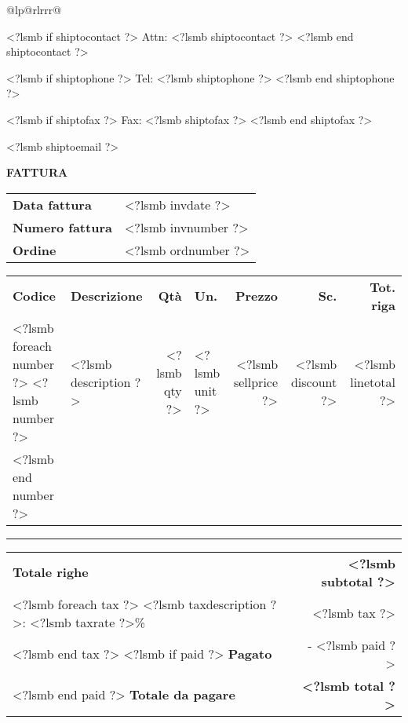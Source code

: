\documentclass[twoside]{scrartcl}
\begin{document}
\begin{tabular*}{\textwidth}{@{}lp{\descrwidth}@{\extracolsep\fill}rlrrr@{}}
{<?lsmb if shiptocontact ?>
Attn: <?lsmb shiptocontact ?>
\vspace{0.3cm}
<?lsmb end shiptocontact ?>

<?lsmb if shiptophone ?>
Tel: <?lsmb shiptophone ?>
<?lsmb end shiptophone ?>

<?lsmb if shiptofax ?>
Fax: <?lsmb shiptofax ?>
<?lsmb end shiptofax ?>

<?lsmb shiptoemail ?>
}
\hfill

\vspace{1cm}

\textbf{FATTURA}
\hfill

\vspace{1cm}

\begin{tabular}[t]{l@{\hspace{0.3cm}}l}
  \textbf{Data fattura} & <?lsmb invdate ?> \\
  \textbf{Numero fattura} & <?lsmb invnumber ?> \\
  \textbf{Ordine} & <?lsmb ordnumber ?>
\end{tabular}

\vspace{1cm}

\begin{tabular*}{\textwidth}{@{}lp{\descrwidth}@{\extracolsep\fill}rlrrr@{}}
  \textbf{Codice} & \textbf{Descrizione} & \textbf{Qt\`a} &
    \textbf{Un.} & \textbf{Prezzo} & \textbf{Sc.} & \textbf{Tot. riga} \\
<?lsmb foreach number ?>
  <?lsmb number ?> & <?lsmb description ?> & <?lsmb qty ?> &
    <?lsmb unit ?> & <?lsmb sellprice ?> & <?lsmb discount ?> & <?lsmb linetotal ?> \\
<?lsmb end number ?>
\end{tabular*}


\parbox{\textwidth}{
\rule{\textwidth}{2pt}

\vspace{0.2cm}

\hfill
\begin{tabularx}{7cm}{Xr@{}}
  \textbf{Totale righe} & \textbf{<?lsmb subtotal ?>} \\
<?lsmb foreach tax ?>
  <?lsmb taxdescription ?>: <?lsmb taxrate ?>\% & <?lsmb tax ?>\\
<?lsmb end tax ?>
<?lsmb if paid ?>
  \textbf{Pagato} & - <?lsmb paid ?> \\
<?lsmb end paid ?>
  \hline
  \textbf{Totale da pagare} & \textbf{<?lsmb total ?>} \\
\end{tabularx}

}
\end{tabular*}
\end{document}
